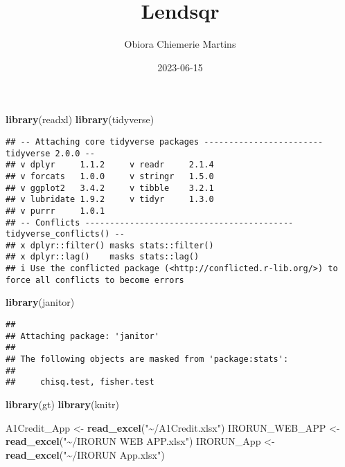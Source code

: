 \documentclass[
]{article}
\title{Lendsqr}
\author{Obiora Chiemerie Martins}
\date{2023-06-15}
\newenvironment{Shaded}{\begin{snugshade}}{\end{snugshade}}
\newcommand{\FunctionTok}[1]{\textcolor[rgb]{0.13,0.29,0.53}{\textbf{#1}}}
\newcommand{\NormalTok}[1]{#1}
\newcommand{\OtherTok}[1]{\textcolor[rgb]{0.56,0.35,0.01}{#1}}
\newcommand{\StringTok}[1]{\textcolor[rgb]{0.31,0.60,0.02}{#1}}
\begin{document}
\maketitle

\begin{Shaded}
\begin{Highlighting}[]
\FunctionTok{library}\NormalTok{(readxl)}
\FunctionTok{library}\NormalTok{(tidyverse)}
\end{Highlighting}
\end{Shaded}

\begin{verbatim}
## -- Attaching core tidyverse packages ------------------------ tidyverse 2.0.0 --
## v dplyr     1.1.2     v readr     2.1.4
## v forcats   1.0.0     v stringr   1.5.0
## v ggplot2   3.4.2     v tibble    3.2.1
## v lubridate 1.9.2     v tidyr     1.3.0
## v purrr     1.0.1     
## -- Conflicts ------------------------------------------ tidyverse_conflicts() --
## x dplyr::filter() masks stats::filter()
## x dplyr::lag()    masks stats::lag()
## i Use the conflicted package (<http://conflicted.r-lib.org/>) to force all conflicts to become errors
\end{verbatim}

\begin{Shaded}
\begin{Highlighting}[]
\FunctionTok{library}\NormalTok{(janitor)}
\end{Highlighting}
\end{Shaded}

\begin{verbatim}
## 
## Attaching package: 'janitor'
## 
## The following objects are masked from 'package:stats':
## 
##     chisq.test, fisher.test
\end{verbatim}

\begin{Shaded}
\begin{Highlighting}[]
\FunctionTok{library}\NormalTok{(gt)}
\FunctionTok{library}\NormalTok{(knitr)}
\end{Highlighting}
\end{Shaded}

\begin{Shaded}
\begin{Highlighting}[]
\NormalTok{A1Credit\_App }\OtherTok{\textless{}{-}} \FunctionTok{read\_excel}\NormalTok{(}\StringTok{"\textasciitilde{}/A1Credit.xlsx"}\NormalTok{)}
\NormalTok{IRORUN\_WEB\_APP }\OtherTok{\textless{}{-}} \FunctionTok{read\_excel}\NormalTok{(}\StringTok{"\textasciitilde{}/IRORUN WEB APP.xlsx"}\NormalTok{)}
\NormalTok{IRORUN\_App }\OtherTok{\textless{}{-}} \FunctionTok{read\_excel}\NormalTok{(}\StringTok{"\textasciitilde{}/IRORUN App.xlsx"}\NormalTok{)}
\end{Highlighting}
\end{Shaded}
\end{document}
